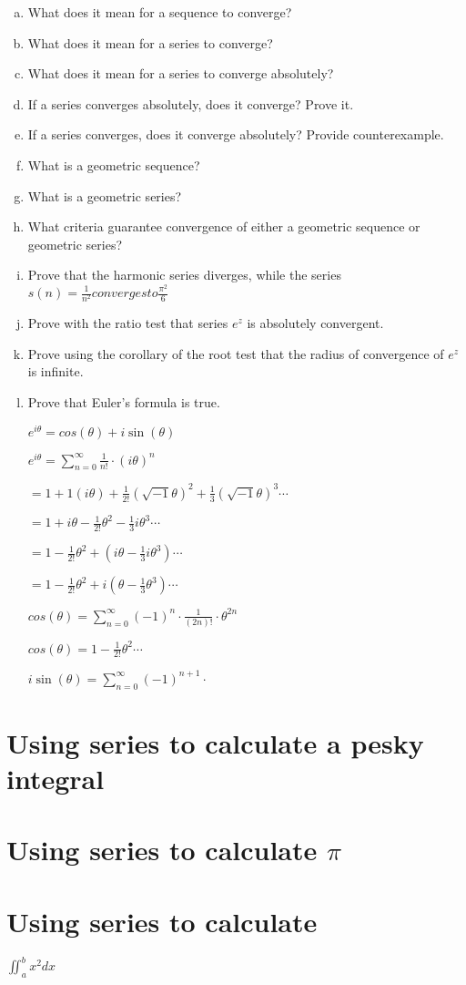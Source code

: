 \documentclass{article}
\begin{document}
\begin{enumerate}[a.]
	\item What does it mean for a sequence to converge?
	\item What does it mean for a series to converge?
	\item What does it mean for a series to converge absolutely?
	\item If a series converges absolutely, does it converge? Prove it.
	\item If a series converges, does it converge absolutely? Provide counterexample.
	\item What is a geometric sequence?
	\item What is a geometric series?
	\item What criteria guarantee convergence of either a geometric sequence or geometric series?
	\item Prove that the harmonic series diverges, while the series $s(n) = \frac{1}{n^2} converges to \frac{\pi^2}{6}$
	\item Prove with the ratio test that series $e^z$ is absolutely convergent.
	\item Prove using the corollary of the root test that the radius of convergence of $e^z$ is infinite.
	\item Prove that Euler's formula is true.

	$e^{i\theta} = cos(\theta) + i\sin(\theta)$

	$e^{i\theta} = \sum_{n=0}^{\infty} \frac{1}{n!} \cdot (i\theta)^n$

	$ = 1 + 1(i\theta) + \frac{1}{2!}(\sqrt{-1}\theta)^2 + \frac{1}{3}(\sqrt{-1}\theta)^3 \cdots $

	$ = 1 + i\theta - \frac{1}{2!}\theta^2 - \frac{1}{3}i\theta^3  \cdots$

	$ = 1 - \frac{1}{2!}\theta^2 + (i\theta - \frac{1}{3}i\theta^3)  \cdots$

	$ = 1 - \frac{1}{2!}\theta^2 + i(\theta - \frac{1}{3}\theta^3)  \cdots$

	$cos(\theta) = \sum_{n=0}^{\infty} (-1)^n \cdot \frac{1}{(2n)!} \cdot \theta^{2n}$

	$cos(\theta) = 1 - \frac{1}{2!}\theta^2 \cdots$

	$i\sin(\theta) = \sum_{n=0}^{\infty} (-1)^{n+1} \cdot $

\end{enumerate}

\section{Using series to calculate a pesky integral}

\section{Using series to calculate $\pi$}

\section{Using series to calculate}

$\iint_{a}^{b} x^2 dx$
\end{document}
